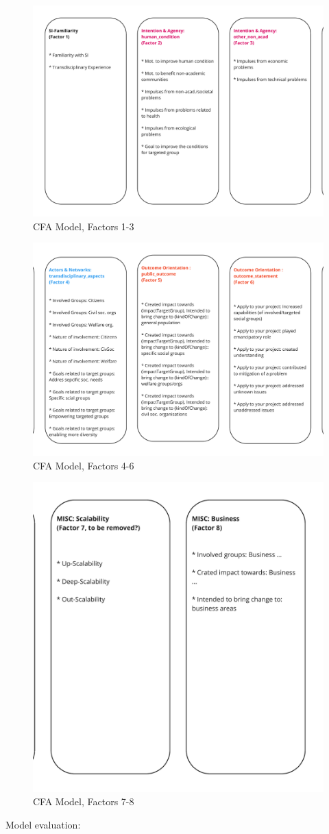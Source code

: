 \documentclass[
]{article}
\begin{document}
\begin{figure}

{\centering \includegraphics[width=0.3\linewidth]{../06_model/factor123} 

}

\caption{CFA Model, Factors 1-3}\label{fig:unnamed-chunk-10}
\end{figure}
\begin{figure}

{\centering \includegraphics[width=0.3\linewidth]{../06_model/factor456} 

}

\caption{CFA Model, Factors 4-6}\label{fig:unnamed-chunk-11}
\end{figure}
\begin{figure}

{\centering \includegraphics[width=0.3\linewidth]{../06_model/factor78} 

}

\caption{CFA Model, Factors 7-8}\label{fig:unnamed-chunk-12}
\end{figure}

Model evaluation:
\end{document}
